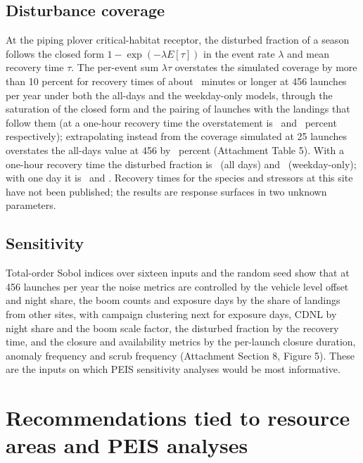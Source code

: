 \documentclass[11pt]{article}
\begin{document}
\subsection{Disturbance coverage}

At the piping plover critical-habitat receptor, the disturbed fraction of a season follows the closed form $1 - \exp(-\lambda E[\tau])$ in the event rate $\lambda$ and mean recovery time $\tau$. The per-event sum $\lambda\tau$ overstates the simulated coverage by more than 10 percent for recovery times of about \valEFiveWeekdayTauOneZeroPctMin~minutes or longer at 456 launches per year under both the all-days and the weekday-only models, through the saturation of the closed form and the pairing of launches with the landings that follow them (at a one-hour recovery time the overstatement is \valEFivePoissonOverTauOneHPct~and \valEFiveWeekdayOverTauOneHPct~percent respectively); extrapolating instead from the coverage simulated at 25 launches overstates the all-days value at 456 by \valEOneRelerrPctDisturbedPipingPloverCriticalHabitatNearPadOneDp~percent (Attachment Table 5). With a one-hour recovery time the disturbed fraction is \valEOneNFourFiveSixDisturbedHabitat~(all days) and \valEFiveWeekdayDisturbedTauOneH~(weekday-only); with one day it is \valEFivePoissonDisturbedTauTwoFourH~and \valEFiveWeekdayDisturbedTauTwoFourH. Recovery times for the species and stressors at this site have not been published; the results are response surfaces in two unknown parameters.

\subsection{Sensitivity}

Total-order Sobol indices over sixteen inputs and the random seed show that at 456 launches per year the noise metrics are controlled by the vehicle level offset and night share, the boom counts and exposure days by the share of landings from other sites, with campaign clustering next for exposure days, CDNL by night share and the boom scale factor, the disturbed fraction by the recovery time, and the closure and availability metrics by the per-launch closure duration, anomaly frequency and scrub frequency (Attachment Section 8, Figure 5). These are the inputs on which PEIS sensitivity analyses would be most informative.

\section{Recommendations tied to resource areas and PEIS analyses}
\end{document}
